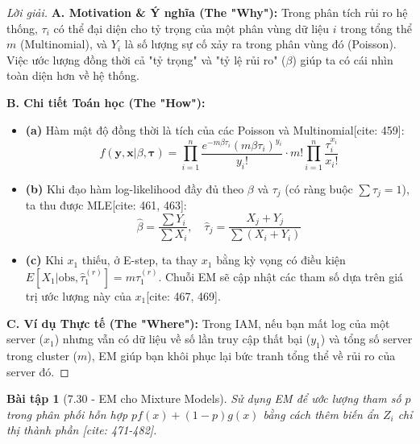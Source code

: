 \documentclass[8pt,a4paper]{article}
\newtheorem{exercise}{Bài tập}
\newenvironment{solution}{\begin{proof}[Lời giải]}{\end{proof}}
\begin{document}
\begin{solution}
\textbf{A. Motivation \& Ý nghĩa (The "Why"):} Trong phân tích rủi ro hệ thống, $\tau_i$ có thể đại diện cho tỷ trọng của một phân vùng dữ liệu $i$ trong tổng thể $m$ (Multinomial), và $Y_i$ là số lượng sự cố xảy ra trong phân vùng đó (Poisson). Việc ước lượng đồng thời cả "tỷ trọng" và "tỷ lệ rủi ro" ($\beta$) giúp ta có cái nhìn toàn diện hơn về hệ thống.

\textbf{B. Chi tiết Toán học (The "How"):}
\begin{itemize}
    \item \textbf{(a)} Hàm mật độ đồng thời là tích của các Poisson và Multinomial[cite: 459]:
    \[ f(\mathbf{y}, \mathbf{x} | \beta, \boldsymbol{\tau}) = \prod_{i=1}^n \frac{e^{-m\beta\tau_i}(m\beta\tau_i)^{y_i}}{y_i!} \cdot m! \prod_{i=1}^n \frac{\tau_i^{x_i}}{x_i!} \]
    \item \textbf{(b)} Khi đạo hàm log-likelihood đầy đủ theo $\beta$ và $\tau_j$ (có ràng buộc $\sum \tau_j = 1$), ta thu được MLE[cite: 461, 463]:
    \[ \hat{\beta} = \frac{\sum Y_i}{\sum X_i}, \quad \hat{\tau}_j = \frac{X_j + Y_j}{\sum (X_i + Y_i)} \]
    \item \textbf{(c)} Khi $x_1$ thiếu, ở E-step, ta thay $x_1$ bằng kỳ vọng có điều kiện $E[X_1 | \text{obs}, \hat{\tau}_1^{(r)}] = m\hat{\tau}_1^{(r)}$. Chuỗi EM sẽ cập nhật các tham số dựa trên giá trị ước lượng này của $x_1$[cite: 467, 469].
\end{itemize}

\textbf{C. Ví dụ Thực tế (The "Where"):} Trong IAM, nếu bạn mất log của một server ($x_1$) nhưng vẫn có dữ liệu về số lần truy cập thất bại ($y_1$) và tổng số server trong cluster ($m$), EM giúp bạn khôi phục lại bức tranh tổng thể về rủi ro của server đó.
\end{solution}

\begin{exercise}[7.30 - EM cho Mixture Models]
Sử dụng EM để ước lượng tham số $p$ trong phân phối hỗn hợp $pf(x) + (1-p)g(x)$ bằng cách thêm biến ẩn $Z_i$ chỉ thị thành phần [cite: 471-482].
\end{exercise}
\end{document}
